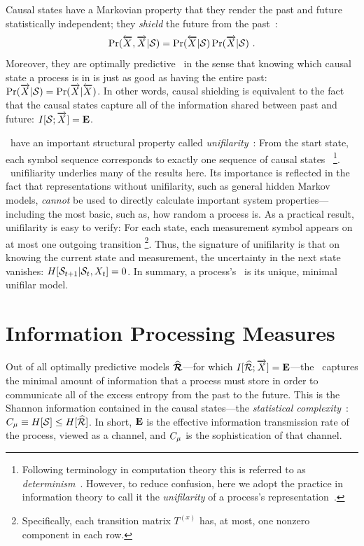 Causal states have a Markovian property that they render the past and future
statistically independent; they \emph{shield} the future from the past~\cite{Crut98d}:
\begin{equation}
\Pr(\overleftarrow {{X}},\overrightarrow{{X}}|\mathcal{S})
  = \Pr(\overleftarrow {{X}}|\mathcal{S}) \Pr(\overrightarrow{{X}}|\mathcal{S}) ~.
\label{shield}
\end{equation}
Moreover, they are optimally predictive~\cite{Crut88a} in the sense that
knowing which causal state a process is in is just as good as having the
entire past: $\Pr(\overrightarrow{{X}}|\mathcal{S}) = \Pr(\overrightarrow{{X}}|\overleftarrow {{X}})$. In other
words, causal shielding is equivalent to the fact~\cite{Crut98d} that the
causal states capture all of the information shared between past and future:
$I[\mathcal{S};\overrightarrow{{X}}] = {\bf E}$.

\EMs\ have an important structural property called
\emph{unifilarity}~\cite{Crut88a,Shal98a}: From the start state, each symbol 
sequence corresponds to exactly one sequence of causal states~%
\footnote{Following terminology in computation theory 
this is referred to as \emph{determinism}~\cite{Hopc79}. However, to reduce 
confusion, here we adopt the practice in information theory to call it the 
\emph{unifilarity} of a process's representation~\cite{Ephr02a}.}.
\EM\ unifiliarity underlies many of the results here. Its importance is
reflected in the fact that representations without unifilarity, such as general
hidden Markov models, \emph{cannot} be used to directly calculate important
system properties---including the most basic, such as, how random a process is.
As a practical result, unifilarity is easy to verify: For each state, each
 measurement symbol appears on at most one outgoing transition
\footnote{Specifically, each transition matrix $T^{(x)}$ has, at most, one
nonzero component in each row.}. Thus, the signature of unifilarity is that on 
knowing the current state and measurement, the uncertainty in the next state
 vanishes: $H[\mathcal{S}_{t+1}|\mathcal{S}_t,{X}_t] = 0$.
In summary, a process's \eM\ is its unique, minimal unifilar model. 

\section{Information Processing Measures}

Out of all optimally predictive models $\boldsymbol{\widehat{\mathcal{R}}}$---for which
$I[\widehat{\mathcal{R}};\overrightarrow{{X}}] = {\bf E}$---the \eM\ captures the minimal 
amount of information that a process must store in order to communicate all
of the excess entropy from the past to the future.  This is the Shannon
information contained in the causal states---the \emph{statistical complexity}~\cite{Crut98d}: 
$C_\mu \equiv H[\mathcal{S}] \leq H[\widehat{\mathcal{R}}]$. In short, ${\bf E}$ is the
effective information transmission rate of the process, viewed 
as a channel, and $C_\mu$ is the sophistication of that channel.

